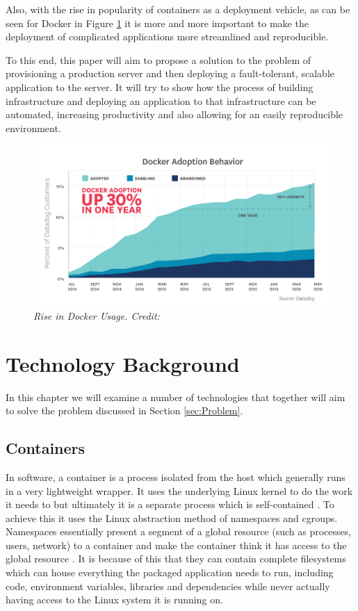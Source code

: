 \documentclass{article}
\begin{document}
Also, with the rise in popularity of containers as a deployment vehicle, as can be seen for Docker in Figure \ref{fig:datadog} it is more and more important to make the deployment of complicated applications more streamlined and reproducible.

To this end, this paper will aim to propose a solution to the problem of provisioning a production server and then deploying a fault-tolerant, scalable application to the server. It will try to show how the process of building infrastructure and deploying an application to that infrastructure can be automated, increasing productivity and also allowing for an easily reproducible environment.

\begin{figure}[!h]
\centering
\includegraphics*[width=1\textwidth]{components/images/datadog}
\caption{\em Rise in Docker Usage. Credit: \citep{datadog}}
\label{fig:datadog}
\end{figure}
 
\newpage
\section{Technology Background}
\label{sec:Background}

In this chapter we will examine a number of technologies that together will aim to solve the problem discussed in Section \ref{sec:Problem}.

\subsection{Containers} %
\label{sub:Containers}
In software, a container is a process isolated from the host which generally runs in a very lightweight wrapper. It uses the underlying Linux kernel to do the work it needs to but ultimately it is a separate process which is self-contained \citep{Matthias2015}. To achieve this it uses the Linux abstraction method of namespaces and cgroups. Namespaces essentially present a segment of a global resource (such as processes, users, network) to a container and make the container think it has access to the global resource \citep{Kerrisk2013}. It is because of this that they can contain complete filesystems which can house everything the packaged application needs to run, including code, environment variables, libraries and dependencies while never actually having access to the Linux system it is running on.
\end{document}
